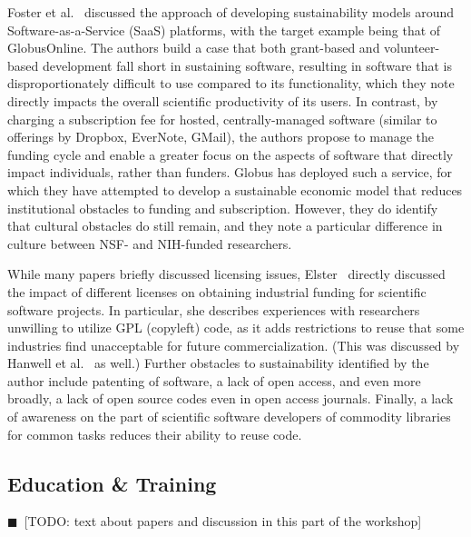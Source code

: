 \documentclass[11pt, oneside]{amsart}
\newcommand{\todo}[1]{{\color{blue}$\blacksquare$~\textsf{[TODO: #1]}}}
\newcommand{\note}[1]{ {\textcolor{red}    { #1 }}}
\newcommand{\toolname}[1] {\textsf{#1}}
\begin{document}
Foster et al.~\cite{Foster_WSSSPE} discussed the approach of developing sustainability models
around Software-as-a-Service (SaaS) platforms, with the target example being
that of \toolname{GlobusOnline}.  The authors build a case that both grant-based and
volunteer-based development fall short in sustaining software, resulting in
software that is disproportionately difficult to use compared to its
functionality, which they note directly impacts the overall scientific
productivity of its users.  In contrast, by charging a subscription fee for
hosted, centrally-managed software (similar to offerings by \toolname{Dropbox}, \toolname{EverNote},
\toolname{GMail}), the authors propose to manage the funding cycle and enable a greater
focus on the aspects of software that directly impact individuals, rather than
funders.  \toolname{Globus} has deployed such a service, for which they have attempted to
develop a sustainable economic model that reduces institutional obstacles to
funding and subscription.  However, they do identify that cultural obstacles
do still remain, and they note a particular difference in culture between NSF-
and NIH-funded researchers.

While many papers briefly discussed licensing issues, Elster~\cite{Elster_WSSSPE}
directly discussed the impact of different licenses on obtaining industrial
funding for scientific software projects.  In particular, she describes
experiences with researchers unwilling to utilize GPL (copyleft) code, as it
adds restrictions to reuse that some industries find unacceptable for future
commercialization.  (This was discussed by Hanwell et al.~\cite{Hanwell_WSSSPE} as well.)
Further obstacles to sustainability identified by the author include patenting
of software, a lack of open access, and even more broadly, a lack of open
source codes even in open access journals.  Finally, a lack of awareness on the
part of scientific software developers of commodity libraries for common tasks
reduces their ability to reuse code.

\subsection{Education \& Training}

\todo{text about papers and discussion in this part of the workshop}


%
%
%
\end{document}
